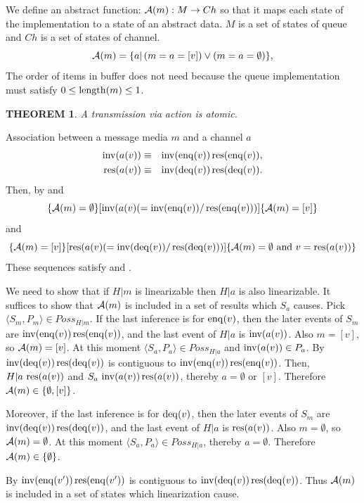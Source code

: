 \documentclass[12pt,a4paper,titlepage]{article}
\makeatletter
\newenvironment{proof}[1][\proofname]{\par
  \normalfont
  \topsep6\p@\@plus6\p@ \trivlist
  \item[\hskip\labelsep{\bfseries #1}\@addpunct{\bfseries.}]\ignorespaces
}{%
  \endtrivlist
}
\newcommand{\proofname}{Proof Sketch}
\theoremstyle{break}
\newtheorem{theorem}{THEOREM}[section]
\makeatother
\begin{document}
We define an abstract function: \({\cal A}(m):M\rightarrow Ch\) so that it maps each state of the implementation to a state of an abstract data.
$M$ is a set of states of queue and $Ch$ is a set of states of channel.
  \begin{displaymath}
{\cal A}(m)=\{a|\,(m=a=[v])\vee(m=a=\emptyset)\},
  \end{displaymath}
The order of items in buffer does not need because the queue implementation must satisfy  \(0\leq\length(m)\leq 1\).

  \begin{theorem}
A transmission via action is atomic.
  \end{theorem}
  \begin{proof}
Association between a message media $m$ and a channel $a$
    \begin{eqnarray*}
\inv(a(v))&\equiv&\inv(\enq(v))\res(\enq(v)),\\
\res(a(v))&\equiv&\inv(\deq(v))\res(\deq(v)).
    \end{eqnarray*}
Then, by  and 
  \begin{displaymath}
\{{\cal A}(m)=\emptyset\}[\inv(a(v) (=\inv(\enq(v))/\res(\enq(v)))]\{{\cal A}(m)=[v]\}
  \end{displaymath}
and
  \begin{displaymath}
\{{\cal A}(m)=[v]\}[\res(a(v) (=\inv(\deq(v))/\res(\deq(v)))]\{{\cal A}(m)=\emptyset\mbox{ and }v=\res(a(v))\}
  \end{displaymath}
These sequences satisfy  and .

We need to show that if \(H|m\) is linearizable then \(H|a\) is also linearizable.
It suffices to show that \({\cal A}(m)\) is included in a set of results which \(S_a\) causes.
Pick \(\langle S_m,P_m\rangle\in Poss_{H|m}\).
If the last inference is  for \(\enq(v)\), then the later events of \(S_m\) are \(\inv(\enq(v))\res(\enq(v))\), and the last event of \(H|a\) is \(\inv(a(v))\).
Also \(m=[v]\), so \({\cal A}(m)=[v]\).
At this moment \(\langle S_{a},P_{a}\rangle\in Poss_{H|a}\) and \(\inv(a(v))\in P_{a}\).
By  \(\inv(\deq(v))\res(\deq(v))\) is contiguous to \(\inv(\enq(v))\res(\enq(v))\).
Then, \(H|a\,\res(a(v))\) and \(S_a\,\inv(a(v))\res(a(v))\), thereby \(a=\emptyset\) or \([v]\).
Therefore \({\cal A}(m)\in\{\emptyset, [v]\}\).

Moreover, if the last inference is  for \(\deq(v)\), then the later events of \(S_m\) are \(\inv(\deq(v))\res(\deq(v))\), and the last event of \(H|a\) is \(\res(a(v))\).
Also \(m=\emptyset\), so \({\cal A}(m)=\emptyset\).
At this moment \(\langle S_{a},P_{a}\rangle\in Poss_{H|a}\), thereby \(a=\emptyset\).
Therefore \({\cal A}(m)\in\{\emptyset\}\).

By  \(\inv(\enq(v'))\res(\enq(v'))\) is contiguous to \(\inv(\deq(v))\res(\deq(v))\).
Thus \({\cal A}(m)\) is included in a set of states which linearization cause.
\QED
  \end{proof}
%
%
\end{document}
